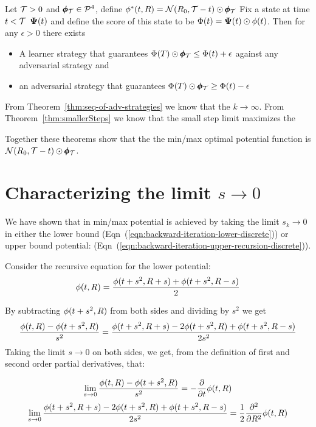 \documentclass{article}[12pt]
\begin{document}
\begin{theorem} \label{thm:min-max-limit}
Let $\mathcal{T}>0$ and $\pmb{\phi}_{\mathcal{T}} \in {\cal P}^{4}$, define $\phi^*(t,R) = {\cal N}(R_0,\mathcal{T}-t) \odot \pmb{\phi}_{\mathcal{T}}$
Fix a state at time $t<\mathcal{T}$ ${\bf \Psi}(t)$ and define the score of this state
to be $\Phi(t) = {\bf \Psi}(t) \odot \phi(t)$. Then for any $\epsilon>0$ there exists
\begin{itemize}
\item A learner strategy that guarantees $\Phi(T) \odot \pmb{\phi}_{\mathcal{T}} \leq \Phi(t)+\epsilon$ against any adversarial strategy and
  \item an adversarial strategy that guarantees  $\Phi(T) \odot \pmb{\phi}_{\mathcal{T}} \geq \Phi(t)-\epsilon$
\end{itemize}
\end{theorem}
\proof
From Theorem~\ref{thm:seq-of-adv-strategies} we know that the  $k \to \infty$.
From Theorem~\ref{thm:smallerSteps} we know that the small step limit maximizes the 

Together these theorems show that the the min/max optimal potential function is $ {\cal N}(R_0,\mathcal{T}-t) \odot \pmb{\phi}_{\mathcal{T}}$.

\section{Characterizing the limit $s \to 0$}
\label{sec:continuous}

We have shown that in min/max potential is achieved by taking the
limit $s_k \to 0$ in either the lower bound
(Eqn~(\ref{eqn:backward-iteration-lower-discrete})) or upper bound
potential:
(Eqn~(\ref{eqn:backward-iteration-upper-recursion-discrete})).

Consider the recursive equation for the lower potential:
 \begin{equation}
   \phi(t, R) =  \frac{\phi(t+s^2,R+s) + \phi(t+s^2,R-s)}{2}
 \end{equation}

 By subtracting $\phi(t+s^2,R)$ from both sides and dividing by $s^2$ we get 
 \begin{equation}
   \frac{\phi(t, R)  - \phi(t+s^2,R)}{s^2} =  \frac{\phi(t+s^2,R+s) - 2\phi(t+s^2,R)+\phi(t+s^2,R-s)}{2s^2} \label{eqn:difference}
 \end{equation}
 Taking the limit $s \to 0$ on both sides, we get, from the definition of first and second order partial derivatives, that:

 \begin{equation}
   \lim_{s \to 0}\frac{\phi(t, R)  - \phi(t+s^2,R)}{s^2} =  -\frac{\partial}{\partial t} \phi(t,R)
   \label{eqn:dt}
   \end{equation}
 \begin{equation}
   \lim_{s \to 0}
   \frac{\phi(t+s^2,R+s) - 2\phi(t+s^2,R)+\phi(t+s^2,R-s)}{2s^2}
   =  \frac{1}{2} \frac{\partial^2}{\partial R^2} \phi(t,R)
\label{eqn:ddR2}
 \end{equation}
\end{document}
